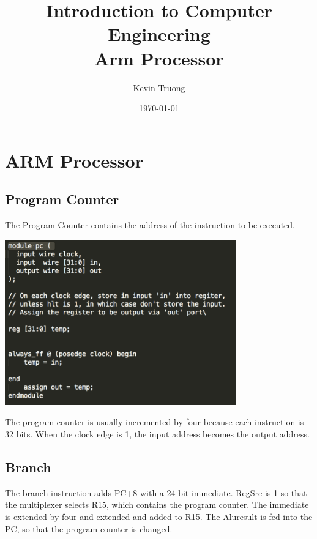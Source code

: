 \documentclass[11pt,a4paper,titlepage]{article}
\title{\blue Introduction to Computer Engineering\\
\blueb Arm Processor}
\author{Kevin Truong}
\date{\today}
\begin{document}
\maketitle
\section{ARM Processor}{%

    \subsection{Program Counter}{
        The Program Counter contains the address of the instruction to be executed.
        \begin{center}
            \includegraphics[width=100mm, scale =1]{pc.png}
        \end{center}
        The program counter is usually incremented by four because each instruction is 32 bits. When the 
        clock edge is 1, the input address becomes the output address. 
    }\label{sub:sub1}%


    \subsection{Branch}{
        The branch instruction adds PC+8 with a 24-bit immediate. RegSrc is 1 so that the multiplexer
        selects R15, which contains the program counter. The immediate is extended by four and extended and
        added to R15. The Aluresult is fed into the PC, so that the program counter is changed.

    }\label{sub:sub3}



}\label{sec:q1sec}

\end{document}

